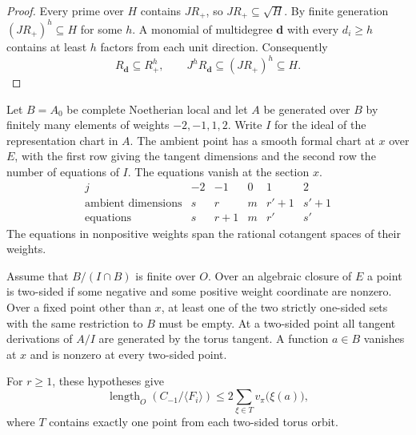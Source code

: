 \begin{proof}
Every prime over \(H\) contains \(J R_+\), so \(J R_+\subseteq\sqrt H\).
By finite generation \((J R_+)^h\subseteq H\) for some \(h\).
A monomial of multidegree \(\mathbf d\) with every \(d_i\ge h\)
contains at least \(h\) factors from each unit direction. Consequently
\[
 R_{\mathbf d}\subseteq R_+^h,\qquad
 J^h R_{\mathbf d}\subseteq (J R_+)^h\subseteq H.
\]
\end{proof}

\begin{proposition}\label{prop:rank-three-conormal}
Let \(B=A_0\) be complete Noetherian local
and let \(A\) be generated over \(B\) by finitely many
elements of weights \(-2,-1,1,2\). Write \(I\) for the
ideal of the representation chart in \(A\). The ambient
point has a smooth formal chart at \(x\) over \(E\),
with the first row giving the tangent dimensions and
the second row the number of equations of \(I\).
The equations vanish at the section \(x\).
\[
\begin{array}{c|ccccc}
 j&-2&-1&0&1&2\\ \hline
 \text{ambient dimensions}&s&r&m&r'+1&s'+1\\
 \text{equations}&s&r+1&m&r'&s'
\end{array}
\tag{2}\label{eq:local-length-2}
\]
The equations in nonpositive weights span the rational
cotangent spaces of their weights.

Assume that \(B/(I\cap B)\)
is finite over \(O\). Over an algebraic closure of \(E\)
a point is two-sided if some negative and some positive
weight coordinate are nonzero. Over a fixed point other
than \(x\), at least one of the two strictly one-sided
sets with the same restriction to \(B\) must be empty.
At a two-sided point all tangent derivations of \(A/I\)
are generated by the torus tangent. A function \(a\in B\)
vanishes at \(x\) and is nonzero at every two-sided point.

For \(r\ge1\), these hypotheses give
\[
 \operatorname{length}_O(C_{-1}/\langle F_i\rangle)
       \le 2\sum_{\xi\in T}v_\pi\bigl(\xi(a)\bigr),
 \tag{3}\label{eq:local-length-3}
\]
where \(T\) contains exactly one point from each two-sided
torus orbit.
\end{proposition}

